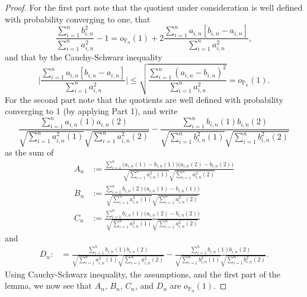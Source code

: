 \documentclass[preprint]{imsart}
\numberwithin{equation}{section}
\begin{document}
\begin{proof}
For the first part note that the quotient under consideration is well defined with probability converging to one, that
%
\begin{equation}
\frac{\sum_{i = 1}^n b^2_{i,n} }{\sum_{i = 1}^n  a^2_{i,n}} - 1 = o_{\mathbb{P}_n}(1) + 2 \frac{\sum_{i = 1}^n  a_{i,n} [b_{i,n} - a_{i,n}]}{\sum_{i = 1}^n  a^2_{i,n}},
\end{equation}
%
and that by the Cauchy-Schwarz inequality 
%
\begin{equation}
\bigg| \frac{\sum_{i = 1}^n  a_{i,n} [b_{i,n} - a_{i,n}]}{\sum_{i = 1}^n  a^2_{i,n}} \bigg|
\leq 
\sqrt{\frac{\sum_{i = 1}^n (a_{i,n} - b_{i,n})^2}{\sum_{i = 1}^n  a^2_{i,n}}} = o_{\mathbb{P}_n}(1).
\end{equation}
%
For the second part note that the quotients are well defined with probability converging to 1 (by applying Part 1), and write
%
\begin{equation}
\frac{\sum_{i = 1}^n a_{i,n}(1)  a_{i,n}(2)}{\sqrt{\sum_{i = 1}^n  a_{i,n}^2(1) } \sqrt{  \sum_{i = 1}^n  a^2_{i,n}(2)}} - \frac{\sum_{i = 1}^n b_{i,n}(1)  b_{i,n}(2)}{\sqrt{\sum_{i = 1}^n  b_{i,n}^2(1)}  \sqrt{\sum_{i = 1}^n  b^2_{i,n}(2)}}
\end{equation}
%
as the sum of
%
\begin{align}
A_n &:= \frac{\sum_{i = 1}^n \big(a_{i,n}(1) - b_{i,n}(1)\big)\big(a_{i,n}(2) - b_{i,n}(2)\big)}{\sqrt{\sum_{i = 1}^n  a_{i,n}^2(1) } \sqrt{  \sum_{i = 1}^n  a^2_{i,n}(2)}}
\\[7pt]
B_n &:= \frac{\sum_{i = 1}^n b_{i,n}(2) \big(a_{i,n}(1) - b_{i,n}(1)\big)}{\sqrt{\sum_{i = 1}^n  a_{i,n}^2(1) } \sqrt{  \sum_{i = 1}^n  a^2_{i,n}(2)}}
\\[7pt]
C_n &:= \frac{\sum_{i = 1}^n b_{i,n}(1)\big(a_{i,n}(2) - b_{i,n}(2)\big)}{\sqrt{\sum_{i = 1}^n  a_{i,n}^2(1) } \sqrt{  \sum_{i = 1}^n  a^2_{i,n}(2)}}
\end{align}
%
and
\begin{align}
D_n :&= \frac{\sum_{i = 1}^n b_{i,n}(1)b_{i,n}(2)}{\sqrt{\sum_{i = 1}^n  a_{i,n}^2(1) } \sqrt{  \sum_{i = 1}^n  a^2_{i,n}(2)}} - \frac{\sum_{i = 1}^n b_{i,n}(1)  b_{i,n}(2)}{\sqrt{\sum_{i = 1}^n  b_{i,n}^2(1)}  \sqrt{\sum_{i = 1}^n  b^2_{i,n}(2)}}.
\end{align}
%
Using Cauchy-Schwarz inequality, the assumptions, and the first part of the lemma, we now see that $A_n$, $B_n$, $C_n$, and $D_n$ are $o_{\mathbb{P}_n}(1)$. 
%


\end{proof}
\end{document}
